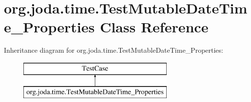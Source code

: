 \hypertarget{classorg_1_1joda_1_1time_1_1_test_mutable_date_time___properties}{\section{org.\-joda.\-time.\-Test\-Mutable\-Date\-Time\-\_\-\-Properties Class Reference}
\label{classorg_1_1joda_1_1time_1_1_test_mutable_date_time___properties}
}
Inheritance diagram for org.\-joda.\-time.\-Test\-Mutable\-Date\-Time\-\_\-\-Properties\-:\begin{figure}[H]
\begin{center}
\leavevmode
\includegraphics[height=2.000000cm]{classorg_1_1joda_1_1time_1_1_test_mutable_date_time___properties}
\end{center}
\end{figure}
